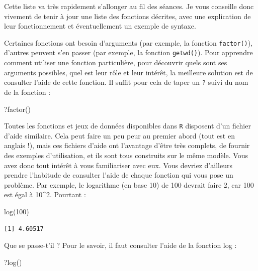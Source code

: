 \documentclass[
  a4paper,
  DIV=11,
  numbers=noendperiod,
  oneside]{scrreprt}
\newenvironment{Shaded}{}{}
\newcommand{\DecValTok}[1]{\textcolor[rgb]{0.00,0.36,0.77}{#1}}
\newcommand{\FunctionTok}[1]{\textcolor[rgb]{0.44,0.26,0.76}{#1}}
\newcommand{\NormalTok}[1]{\textcolor[rgb]{0.14,0.16,0.18}{#1}}
\begin{document}
Cette liste va très rapidement s'allonger au fil des séances. Je vous
conseille donc vivement de tenir à jour une liste des fonctions
décrites, avec une explication de leur fonctionnement et éventuellement
un exemple de syntaxe.

Certaines fonctions ont besoin d'arguments (par exemple, la fonction
\texttt{factor()}), d'autres peuvent s'en passer (par exemple, la
fonction \texttt{getwd()}). Pour apprendre comment utiliser une fonction
particulière, pour découvrir quels sont ses arguments possibles, quel
est leur rôle et leur intérêt, la meilleure solution est de consulter
l'aide de cette fonction. Il suffit pour cela de taper un \texttt{?}
suivi du nom de la fonction :

\begin{Shaded}
\begin{Highlighting}[]
\NormalTok{?}\FunctionTok{factor}\NormalTok{()}
\end{Highlighting}
\end{Shaded}

Toutes les fonctions et jeux de données disponibles dans \texttt{R}
disposent d'un fichier d'aide similaire. Cela peut faire un peu peur au
premier abord (tout est en anglais !), mais ces fichiers d'aide ont
l'avantage d'être très complets, de fournir des exemples d'utilisation,
et ils sont tous construits sur le même modèle. Vous avez donc tout
intérêt à vous familiariser avec eux. Vous devriez d'ailleurs prendre
l'habitude de consulter l'aide de chaque fonction qui vous pose un
problème. Par exemple, le logarithme (en base 10) de 100 devrait faire
2, car 100 est égal à 10\^{}2. Pourtant :

\begin{Shaded}
\begin{Highlighting}[]
\FunctionTok{log}\NormalTok{(}\DecValTok{100}\NormalTok{)}
\end{Highlighting}
\end{Shaded}

\begin{verbatim}
[1] 4.60517
\end{verbatim}

Que se passe-t'il ? Pour le savoir, il faut consulter l'aide de la
fonction log :

\begin{Shaded}
\begin{Highlighting}[]
\NormalTok{?}\FunctionTok{log}\NormalTok{()}
\end{Highlighting}
\end{Shaded}
\end{document}
